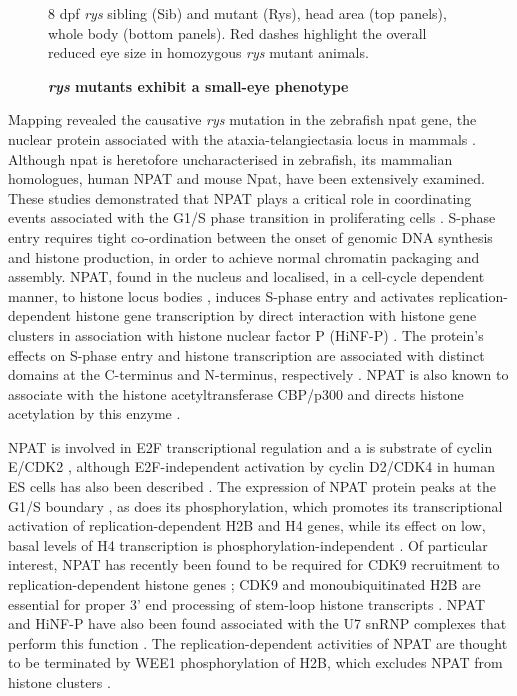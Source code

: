 \begin{figure}[!h]
    \caption{{\bf \textit{rys} mutants exhibit a small-eye phenotype}}
    \label{ryspic}
    8 dpf \textit{rys} sibling (Sib) and mutant (Rys), head area (top panels), whole body (bottom panels). Red dashes highlight the overall reduced eye size in homozygous \textit{rys} mutant animals.
\end{figure}

Mapping revealed the causative \textit{rys} mutation in the zebrafish npat gene, the nuclear protein associated with the ataxia-telangiectasia locus in mammals \cite{Imai1996}. Although npat is heretofore uncharacterised in zebrafish, its mammalian homologues, human NPAT and mouse Npat, have been extensively examined. These studies demonstrated that NPAT plays a critical role in coordinating events associated with the G1/S phase transition in proliferating cells \cite{Ye2003}. S-phase entry requires tight co-ordination between the onset of genomic DNA synthesis and histone production, in order to achieve normal chromatin packaging and assembly. NPAT, found in the nucleus \cite{Sagara2002} and localised, in a cell-cycle dependent manner, to histone locus bodies \cite{Ghule2009}, induces S-phase entry \cite{Zhao1998} and activates replication-dependent histone gene transcription by direct interaction with histone gene clusters \cite{Zhao2000} in association with histone nuclear factor P (HiNF-P) \cite{Mitra2003}. The protein’s effects on S-phase entry and histone transcription are associated with distinct domains at the C-terminus and N-terminus, respectively \cite{Wei2003}. NPAT is also known to associate with the histone acetyltransferase CBP/p300 \cite{Wang2004} and directs histone acetylation by this enzyme \cite{He2011}.

NPAT is involved in E2F transcriptional regulation \cite{Gao2003} and a is substrate of cyclin E/CDK2 \cite{Zhao1998}, although E2F-independent activation by cyclin D2/CDK4 in human ES cells has also been described \cite{Becker2010}. The expression of NPAT protein peaks at the G1/S boundary \cite{Zhao1998}, as does its phosphorylation, which promotes its transcriptional activation of replication-dependent H2B \cite{Ma2000} and H4 \cite{Mitra2009} genes, while its effect on low, basal levels of H4 transcription is phosphorylation-independent \cite{Ye2003}. Of particular interest, NPAT has recently been found to be required for CDK9 recruitment to replication-dependent histone genes \cite{Pirngruber2010}; CDK9 and monoubiquitinated H2B are essential for proper 3’ end processing of stem-loop histone transcripts \cite{Pirngruber2009}. NPAT and HiNF-P have also been found associated with the U7 snRNP complexes that perform this function \cite{Ghule2009}. The replication-dependent activities of NPAT are thought to be terminated by WEE1 phosphorylation of H2B, which excludes NPAT from histone clusters \cite{Mahajan2012}.

